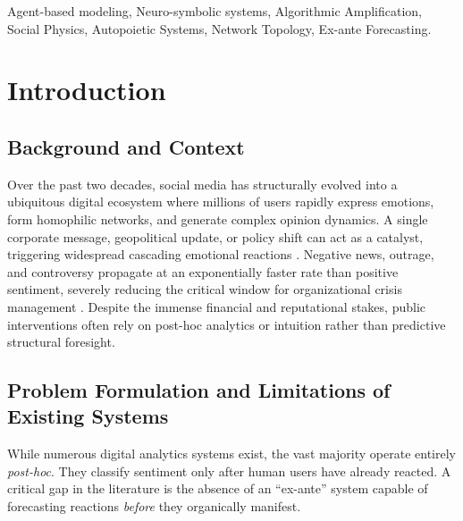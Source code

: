 \documentclass[12pt]{IEEEtran}
\begin{document}
\begin{IEEEkeywords}
Agent-based modeling, Neuro-symbolic systems, Algorithmic Amplification, Social Physics, Autopoietic Systems, Network Topology, Ex-ante Forecasting.
\end{IEEEkeywords}

\section{Introduction}
\label{sec:introduction}

\subsection{Background and Context}
Over the past two decades, social media has structurally evolved into a ubiquitous digital ecosystem where millions of users rapidly express emotions, form homophilic networks, and generate complex opinion dynamics. A single corporate message, geopolitical update, or policy shift can act as a catalyst, triggering widespread cascading emotional reactions \cite{dechoudhury2013}. Negative news, outrage, and controversy propagate at an exponentially faster rate than positive sentiment, severely reducing the critical window for organizational crisis management \cite{yadollahi2016review}. Despite the immense financial and reputational stakes, public interventions often rely on post-hoc analytics or intuition rather than predictive structural foresight.

\subsection{Problem Formulation and Limitations of Existing Systems}
While numerous digital analytics systems exist, the vast majority operate entirely \textit{post-hoc}. They classify sentiment only after human users have already reacted. A critical gap in the literature is the absence of an ``ex-ante'' system capable of forecasting reactions \textit{before} they organically manifest.
\end{document}
